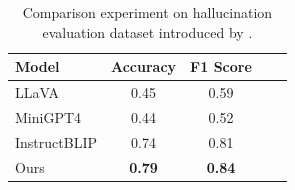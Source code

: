 \begin{table}[t]
\setlength\tabcolsep{3pt}
\centering
\small
\begin{tabular}{lcccc}
\toprule[1.5pt]
Model & Accuracy & F1 Score\\
\midrule
LLaVA & 0.45 & 0.59 \\
MiniGPT4 & 0.44 & 0.52\\
InstructBLIP & 0.74 & 0.81 \\
Ours & \textbf{0.79} & \textbf{0.84} \\
\bottomrule[1.5pt]
\end{tabular}
\vspace{0.05in}
\caption{Comparison experiment on hallucination evaluation dataset introduced by \cite{li2023evaluating}.} 
\label{tab:coco}
\vspace{-0.2in}
\end{table}





